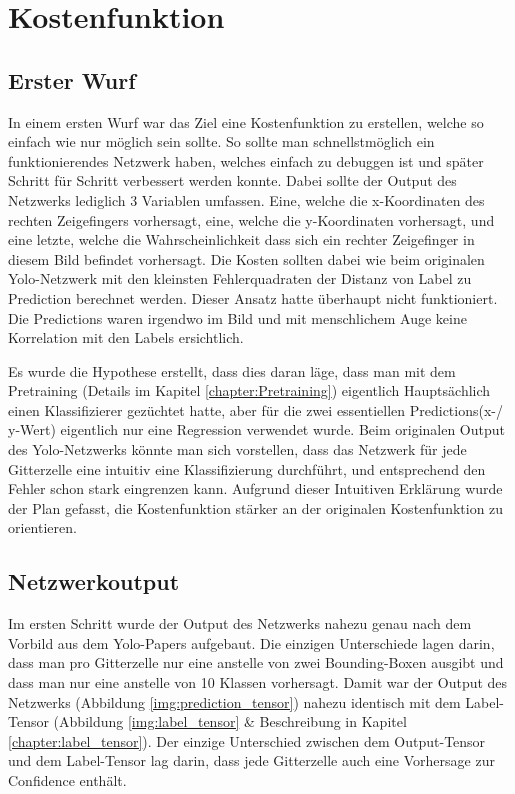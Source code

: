 \newpage
\section{Kostenfunktion} 
\subsection{Erster Wurf}
\label{chapter:erster_wurf}
In einem ersten Wurf war das Ziel eine Kostenfunktion zu erstellen, welche so einfach wie nur möglich sein sollte. 
So sollte man schnellstmöglich ein funktionierendes Netzwerk haben, welches einfach zu debuggen ist und später Schritt für Schritt verbessert werden konnte.
Dabei sollte der Output des Netzwerks lediglich 3 Variablen umfassen. Eine, welche die x-Koordinaten des rechten Zeigefingers vorhersagt, eine, welche die y-Koordinaten vorhersagt, und eine letzte, welche die Wahrscheinlichkeit dass sich ein rechter Zeigefinger in diesem Bild befindet vorhersagt.
Die Kosten sollten dabei wie beim originalen Yolo-Netzwerk mit den kleinsten Fehlerquadraten der Distanz von Label zu Prediction berechnet werden.
Dieser Ansatz hatte überhaupt nicht funktioniert.
Die Predictions waren irgendwo im Bild und mit menschlichem Auge keine Korrelation mit den Labels ersichtlich. 

Es wurde die Hypothese erstellt, dass dies daran läge, dass man mit dem Pretraining (Details im Kapitel \ref{chapter:Pretraining}) eigentlich Hauptsächlich einen Klassifizierer \grqq{}gezüchtet\grqq{} hatte, aber für die zwei essentiellen Predictions(x-/ y-Wert) eigentlich nur eine Regression verwendet wurde.
Beim originalen Output des Yolo-Netzwerks könnte man sich vorstellen, dass das Netzwerk für jede Gitterzelle eine intuitiv eine Klassifizierung durchführt, und entsprechend den Fehler schon stark eingrenzen kann.
Aufgrund dieser Intuitiven Erklärung wurde der Plan gefasst, die Kostenfunktion stärker an der originalen Kostenfunktion zu orientieren.

\subsection{Netzwerkoutput}
Im ersten Schritt wurde der Output des Netzwerks nahezu genau nach dem Vorbild aus dem Yolo-Papers \cite{yolo} aufgebaut. 
Die einzigen Unterschiede lagen darin, dass man pro Gitterzelle nur eine anstelle von zwei Bounding-Boxen ausgibt und dass man nur eine anstelle von 10 Klassen vorhersagt. 
Damit war der Output des Netzwerks (Abbildung \ref{img:prediction_tensor}) nahezu identisch mit dem Label-Tensor (Abbildung \ref{img:label_tensor} \& Beschreibung in Kapitel \ref{chapter:label_tensor}).
Der einzige Unterschied zwischen dem Output-Tensor und dem Label-Tensor lag darin, dass jede Gitterzelle auch eine Vorhersage zur Confidence enthält. 

